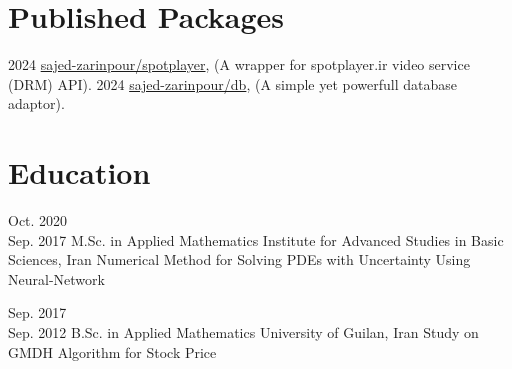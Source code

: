 \documentclass[10pt, a4paper]{article}
\begin{document}
		
	
	\section*{Published Packages}
	\packageEntry
	{2024}
	{
		\href{https://packagist.org/packages/sajed-zarinpour/spotplayer}{sajed-zarinpour/spotplayer}, (A wrapper for spotplayer.ir video service (DRM) API).
	}
	{ 		
	}
	\packageEntry
	{2024}
	{
		\href{https://packagist.org/packages/sajed-zarinpour/db}{sajed-zarinpour/db}, (A simple yet powerfull database adaptor).
	}
	{ 		
	}
	
	\section*{Education} 
	\eduEntry
	{Oct. 2020\\Sep. 2017}
	{M.Sc. in Applied Mathematics}
	{Institute for Advanced Studies in Basic Sciences, Iran}
	{Numerical Method for Solving PDEs with Uncertainty Using Neural-Network}
	{ 
		
	}
	
	\eduEntry
	{Sep. 2017\\Sep. 2012}
	{B.Sc. in Applied Mathematics}
	{University of Guilan, Iran}
	{Study on GMDH Algorithm for Stock Price}
	{ 
	}
	
	
\end{document}
